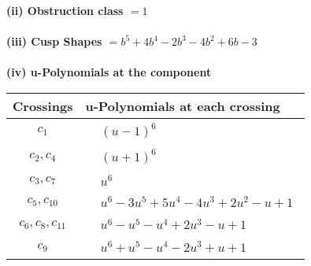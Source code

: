 \documentclass[1p]{elsarticle_modified}
\theoremstyle{definition}
\begin{document}
\flushleft \textbf{(ii) Obstruction class $= 1$}\\~\\
\flushleft \textbf{(iii) Cusp Shapes $= b^5+4 b^4-2 b^3-4 b^2+6 b-3$}\\~\\
\newpage\renewcommand{\arraystretch}{1}
\flushleft \textbf{(iv) u-Polynomials at the component}\newline \\
\begin{tabular}{m{50pt}|m{274pt}}
Crossings & \hspace{64pt}u-Polynomials at each crossing \\
\hline $$\begin{aligned}c_{1}\end{aligned}$$&$\begin{aligned}
&(u-1)^6
\end{aligned}$\\
\hline $$\begin{aligned}c_{2},c_{4}\end{aligned}$$&$\begin{aligned}
&(u+1)^6
\end{aligned}$\\
\hline $$\begin{aligned}c_{3},c_{7}\end{aligned}$$&$\begin{aligned}
&u^6
\end{aligned}$\\
\hline $$\begin{aligned}c_{5},c_{10}\end{aligned}$$&$\begin{aligned}
&u^6-3 u^5+5 u^4-4 u^3+2 u^2- u+1
\end{aligned}$\\
\hline $$\begin{aligned}c_{6},c_{8},c_{11}\end{aligned}$$&$\begin{aligned}
&u^6- u^5- u^4+2 u^3- u+1
\end{aligned}$\\
\hline $$\begin{aligned}c_{9}\end{aligned}$$&$\begin{aligned}
&u^6+u^5- u^4-2 u^3+u+1
\end{aligned}$\\
\hline
\end{tabular}\\~\\
\end{document}
